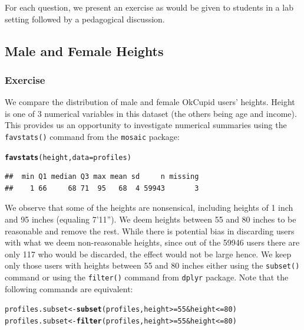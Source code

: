 \documentclass{article}\usepackage[]{graphicx}\usepackage[]{color}
\makeatletter
\newcommand{\hlnum}[1]{\textcolor[rgb]{0.686,0.059,0.569}{#1}}%
\newcommand{\hlopt}[1]{\textcolor[rgb]{0,0,0}{#1}}%
\newcommand{\hlstd}[1]{\textcolor[rgb]{0.345,0.345,0.345}{#1}}%
\newcommand{\hlkwb}[1]{\textcolor[rgb]{0.69,0.353,0.396}{#1}}%
\newcommand{\hlkwc}[1]{\textcolor[rgb]{0.333,0.667,0.333}{#1}}%
\newcommand{\hlkwd}[1]{\textcolor[rgb]{0.737,0.353,0.396}{\textbf{#1}}}%
\newenvironment{kframe}{%
 \def\at@end@of@kframe{}%
 \ifinner\ifhmode%
  \def\at@end@of@kframe{\end{minipage}}%
  \begin{minipage}{\columnwidth}%
 \fi\fi%
 \def\FrameCommand##1{\hskip\@totalleftmargin \hskip-\fboxsep
 \colorbox{shadecolor}{##1}\hskip-\fboxsep
     \hskip-\linewidth \hskip-\@totalleftmargin \hskip\columnwidth}%
 \MakeFramed {\advance\hsize-\width
   \@totalleftmargin\z@ \linewidth\hsize
   \@setminipage}}%
 {\par\unskip\endMakeFramed%
 \at@end@of@kframe}
\newenvironment{knitrout}{}{} %
\makeatother
\begin{document}
For each question, we present an exercise as would be given to students in a lab setting followed by a pedagogical discussion.


\subsection{Male and Female Heights}\label{section_height}
\subsubsection{Exercise}
We compare the distribution of male and female OkCupid users' heights.  Height is one of 3 numerical variables in this dataset (the others being age and income).  This provides us an opportunity to investigate numerical summaries using the \verb#favstats()# command from the \verb#mosaic# package:

\begin{center}
\begin{knitrout}
\color{fgcolor}\begin{kframe}
\begin{alltt}
\hlkwd{favstats}\hlstd{(height,} \hlkwc{data}\hlstd{=profiles)}
\end{alltt}
\begin{verbatim}
##  min Q1 median Q3 max mean sd     n missing
##    1 66     68 71  95   68  4 59943       3
\end{verbatim}
\end{kframe}
\end{knitrout}
\end{center}

We observe that some of the heights are nonsensical, including heights of 1 inch and 95 inches (equaling 7'11'').  We deem heights between 55 and 80 inches to be reasonable and remove the rest.  While there is potential bias in discarding users with what we deem non-reasonable heights, since out of the 59946 users there are only 117 who would be discarded, the effect would not be large hence.  We keep only those users with heights between 55 and 80 inches either using the \verb#subset()# command or using the \verb#filter()# command from \verb#dplyr# package. Note that the following commands are equivalent:

\begin{knitrout}
\color{fgcolor}\begin{kframe}
\begin{alltt}
\hlstd{profiles.subset} \hlkwb{<-} \hlkwd{subset}\hlstd{(profiles, height}\hlopt{>=}\hlnum{55} \hlopt{&} \hlstd{height} \hlopt{<=}\hlnum{80}\hlstd{)}
\hlstd{profiles.subset} \hlkwb{<-} \hlkwd{filter}\hlstd{(profiles, height}\hlopt{>=}\hlnum{55} \hlopt{&} \hlstd{height} \hlopt{<=}\hlnum{80}\hlstd{)}
\end{alltt}
\end{kframe}
\end{knitrout}
\end{document}
